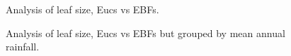 \documentclass[12pt,a4paper,oneside]{article}
\begin{document}
\begin{figure}[!hbtp]
\centering
{}
\caption{\small{Analysis of leaf size, Eucs vs EBFs.}}
\label{}
\end{figure}

\FloatBarrier

\begin{figure}[!hbtp]
\centering
{}
\caption{\small{Analysis of leaf size, Eucs vs EBFs but grouped by mean annual rainfall.}}
\label{}
\end{figure}
\end{document}
